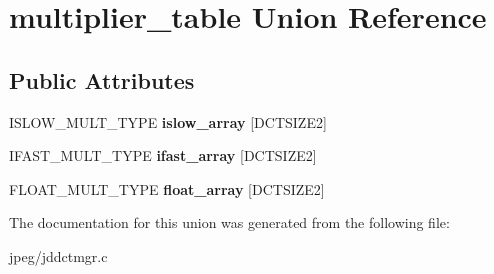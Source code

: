 \hypertarget{unionmultiplier__table}{}\section{multiplier\+\_\+table Union Reference}
\label{unionmultiplier__table}
\subsection*{Public Attributes}
\begin{DoxyCompactItemize}
\item 
I\+S\+L\+O\+W\+\_\+\+M\+U\+L\+T\+\_\+\+T\+Y\+PE {\bfseries islow\+\_\+array} \mbox{[}D\+C\+T\+S\+I\+Z\+E2\mbox{]}\hypertarget{unionmultiplier__table_a8585c9759405a74e7cbd4d6b3f8da073}{}\label{unionmultiplier__table_a8585c9759405a74e7cbd4d6b3f8da073}

\item 
I\+F\+A\+S\+T\+\_\+\+M\+U\+L\+T\+\_\+\+T\+Y\+PE {\bfseries ifast\+\_\+array} \mbox{[}D\+C\+T\+S\+I\+Z\+E2\mbox{]}\hypertarget{unionmultiplier__table_a815932c92e5d7cea970c6cddb5bbf6f1}{}\label{unionmultiplier__table_a815932c92e5d7cea970c6cddb5bbf6f1}

\item 
F\+L\+O\+A\+T\+\_\+\+M\+U\+L\+T\+\_\+\+T\+Y\+PE {\bfseries float\+\_\+array} \mbox{[}D\+C\+T\+S\+I\+Z\+E2\mbox{]}\hypertarget{unionmultiplier__table_a3867da0f271dbfd782ad1e1603e71e88}{}\label{unionmultiplier__table_a3867da0f271dbfd782ad1e1603e71e88}

\end{DoxyCompactItemize}


The documentation for this union was generated from the following file\+:\begin{DoxyCompactItemize}
\item 
jpeg/jddctmgr.\+c\end{DoxyCompactItemize}
